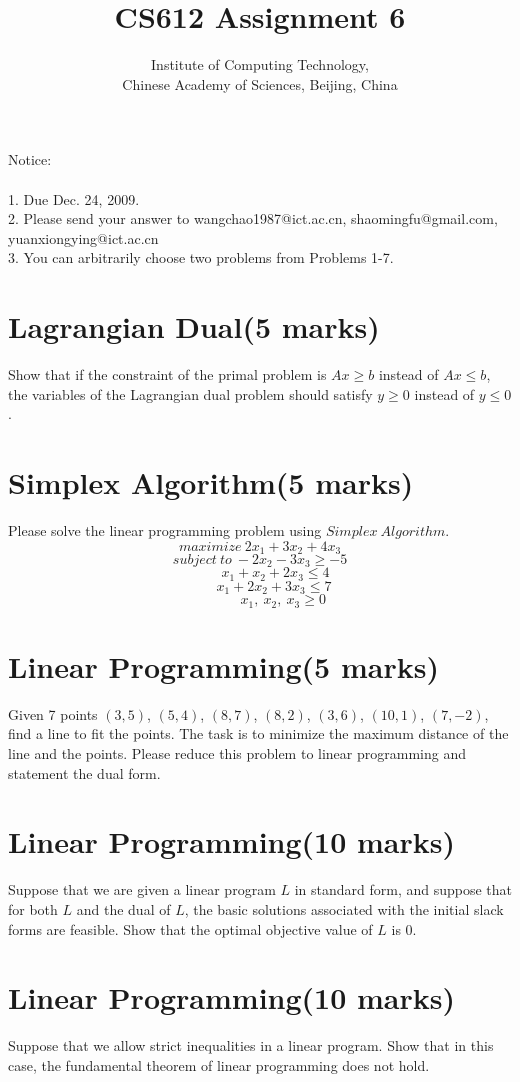 \documentclass[a4paper,11pt]{article}
\title{CS612 Assignment 6}
\author{Institute of Computing Technology, \\
                       Chinese Academy of Sciences, Beijing, China }
\begin{document}
\maketitle

Notice:\\\\
1. Due Dec. 24, 2009.\\
2. Please send your answer to wangchao1987@ict.ac.cn, shaomingfu@gmail.com, yuanxiongying@ict.ac.cn\\
3. You can arbitrarily choose two problems from Problems 1-7.

\section{Lagrangian Dual(5 marks)}
Show that if the constraint of the primal problem is $Ax\geq b$ instead of $Ax\leq b$, the variables of the Lagrangian dual problem should satisfy $y\geq 0$ instead of $y\leq 0$.

\section{Simplex Algorithm(5 marks)}
Please solve the linear programming problem using $Simplex\ Algorithm$.
$$maximize\ 2x_1+3x_2+4x_3$$
$$subject\ to\ -2x_2-3x_3\geq -5$$
$$\ \ \ \ \ \ \ \ \ \  x_1+x_2+2x_3\leq 4$$
$$\ \ \ \ \ \ \ \ \ x_1+2x_2+3x_3\leq 7$$
$$\ \ \ \ \ \ \ \ \ \ \ \ \ \ \ x_1,\ x_2,\ x_3\geq 0$$

\section{Linear Programming(5 marks)}
Given 7 points $(3,5)$, $(5,4)$, $(8,7)$, $(8,2)$, $(3,6)$, $(10,1)$, $(7,-2)$, find a line to fit the points. The task is to minimize the maximum distance of the line and the points. Please reduce this problem to linear programming and statement the dual form.

\section{Linear Programming(10 marks)}
Suppose that we are given a linear program $L$ in standard form, and suppose that for both $L$ and the dual of $L$, the basic solutions associated with the initial slack forms are feasible. Show that the optimal objective value of $L$ is 0.

\section{Linear Programming(10 marks)}
Suppose that we allow strict inequalities in a linear program. Show that in this case, the fundamental theorem of linear programming does not hold.
\end{document}
